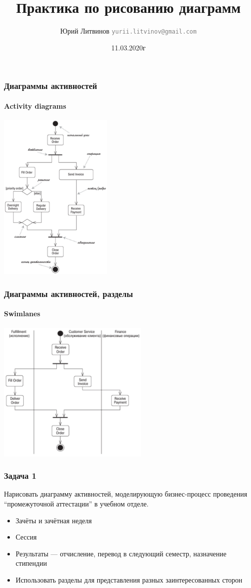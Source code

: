 \documentclass[xetex,mathserif,serif]{beamer}
\title{Практика по рисованию диаграмм}
\author[Юрий Литвинов]{Юрий Литвинов \newline \textcolor{gray}{\small\texttt{yurii.litvinov@gmail.com}}}
\date{11.03.2020г}
\begin{document}
	
	\frame{\titlepage}

	\begin{frame}
		\frametitle{Диаграммы активностей}
		\framesubtitle{Activity diagrams}
		\begin{center}
			\includegraphics[width=0.415\textwidth]{activityDiagram.png}
		\end{center}
	\end{frame}

	\begin{frame}
		\frametitle{Диаграммы активностей, разделы}
		\framesubtitle{Swimlanes}
		\begin{center}
			\includegraphics[width=0.55\textwidth]{activitySwimlanes.png}
		\end{center}
	\end{frame}

	\begin{frame}
		\frametitle{Задача 1}
		Нарисовать диаграмму активностей, моделирующую бизнес-процесс проведения ``промежуточной аттестации'' в учебном отделе.
		\begin{itemize}
			\item Зачёты и зачётная неделя
			\item Сессия
			\item Результаты --- отчисление, перевод в следующий семестр, назначение стипендии
			\item Использовать разделы для представления разных заинтересованных сторон
		\end{itemize}
	\end{frame}
\end{document}
